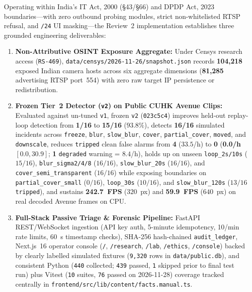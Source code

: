 Operating within India's IT Act, 2000 (\S43/\S66) and DPDP Act, 2023 boundaries---with zero outbound probing modules, strict non-whitelisted RTSP refusal, and \texttt{/24} UI masking---the Review~2 implementation establishes three grounded engineering deliverables:
\begin{enumerate}
  \item \textbf{Non-Attributive OSINT Exposure Aggregate:} Under Censys research access (\texttt{RS-469}), \texttt{data/censys/2026-11-26/snapshot.json} records \textbf{104,218} exposed Indian camera hosts across six aggregate dimensions (\textbf{81,285} advertising RTSP port~554) with zero raw target IP persistence or redistribution.
  \item \textbf{Frozen Tier~2 Detector (\texttt{v2}) on Public CUHK Avenue Clips:} Evaluated against un-tuned \texttt{v1}, frozen \texttt{v2} (\texttt{023c5c4}) improves held-out replay-loop detection from \textbf{1/16} to \textbf{15/16} ($93.8\%$), detects \textbf{16/16} simulated incidents across \texttt{freeze}, \texttt{blur}, \texttt{slow\_blur}, \texttt{cover}, \texttt{partial\_cover}, \texttt{moved}, and \texttt{downscale}, reduces \texttt{tripped} clean false alarms from \textbf{4} ($33.5$/h) to \textbf{0} (\textbf{0.0/h} $[0.0, 30.9]$; \textbf{1} \texttt{degraded} warning = $8.4$/h), holds up on unseen \texttt{loop\_2s/10s} ($15/16$), \texttt{blur\_sigma2/4/8} ($16/16$), \texttt{slow\_blur\_20s} ($16/16$), and \texttt{cover\_semi\_transparent} ($16/16$) while exposing boundaries on \texttt{partial\_cover\_small} ($0/16$), \texttt{loop\_30s} ($10/16$), and \texttt{slow\_blur\_120s} ($13/16$ \texttt{tripped}), and sustains \textbf{242.7~FPS} ($320$~px) and \textbf{59.9~FPS} ($640$~px) on real decoded Avenue frames on CPU.
  \item \textbf{Full-Stack Passive Triage \& Forensic Pipeline:} FastAPI REST/WebSocket ingestion (API key auth, 5-minute idempotency, 10/min rate limits, 60~s timestamp checks), SHA-256 hash-chained \texttt{audit\_ledger}, Next.js~16 operator console (\texttt{/}, \texttt{/research}, \texttt{/lab}, \texttt{/ethics}, \texttt{/console}) backed by clearly labelled simulated fixtures (\texttt{9,320} rows in \texttt{data/public.db}), and consistent Python (\texttt{440} collected; \texttt{439} passed, \texttt{1} skipped prior to final test run) plus Vitest (\texttt{10} suites, \texttt{76} passed on 2026-11-28) coverage tracked centrally in \texttt{frontend/src/lib/content/facts.manual.ts}.
\end{enumerate}

